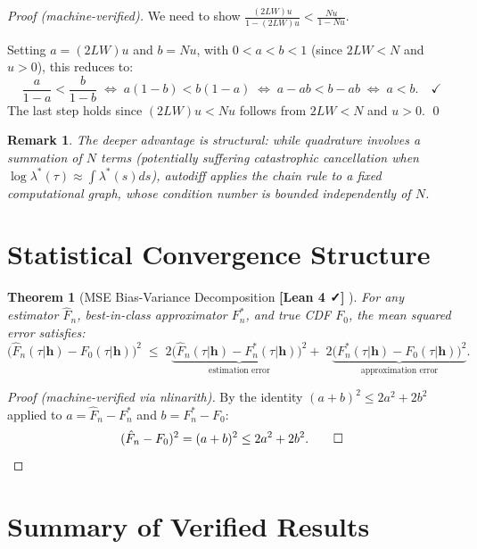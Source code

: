 \documentclass[11pt]{article}
\newtheorem{theorem}{Theorem}[section]
\newtheorem{remark}{Remark}
\newcommand{\verified}{%
  \textcolor{green!60!black}{\textbf{[Lean 4 ✓]}}%
}
\newcommand{\hhat}{\boldsymbol{h}}
\begin{document}
\begin{proof}[Proof (machine-verified)]
We need to show $\frac{(2LW)u}{1-(2LW)u} < \frac{Nu}{1-Nu}$.

Setting $a = (2LW)u$ and $b = Nu$, with $0 < a < b < 1$
(since $2LW < N$ and $u > 0$), this reduces to:
\[
  \frac{a}{1-a} < \frac{b}{1-b}
  \;\iff\; a(1-b) < b(1-a)
  \;\iff\; a - ab < b - ab
  \;\iff\; a < b. \quad\checkmark
\]
The last step holds since $(2LW)u < Nu$ follows from $2LW < N$ and $u > 0$. \qed
\end{proof}

\begin{remark}
The deeper advantage is \emph{structural}: while quadrature involves a
summation of $N$ terms (potentially suffering catastrophic cancellation when
$\log\lambda^*(\tau) \approx \int\lambda^*(s)ds$), autodiff applies the chain rule
to a fixed computational graph, whose condition number is bounded independently of $N$.
\end{remark}

\section{Statistical Convergence Structure}

\begin{theorem}[MSE Bias-Variance Decomposition \verified{}]
\label{thm:mse}
For any estimator $\hat{F}_n$, best-in-class approximator $F_n^*$,
and true CDF $F_0$, the mean squared error satisfies:
\[
  \bigl(\hat{F}_n(\tau|\hhat) - F_0(\tau|\hhat)\bigr)^2
  \;\leq\;
  2\underbrace{\bigl(\hat{F}_n(\tau|\hhat) - F_n^*(\tau|\hhat)\bigr)^2}_{\text{estimation error}}
  +\;
  2\underbrace{\bigl(F_n^*(\tau|\hhat) - F_0(\tau|\hhat)\bigr)^2}_{\text{approximation error}}.
\]
\end{theorem}

\begin{proof}[Proof (machine-verified via nlinarith)]
By the identity $(a + b)^2 \leq 2a^2 + 2b^2$ applied to
$a = \hat{F}_n - F_n^*$ and $b = F_n^* - F_0$:
\[
  (\hat{F}_n - F_0)^2 = (a + b)^2 \leq 2a^2 + 2b^2. \qed
\]
\end{proof}

\section{Summary of Verified Results}
\end{document}
